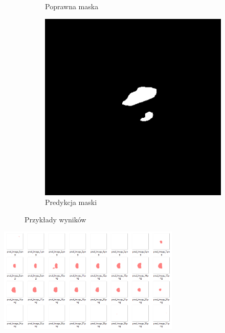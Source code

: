 \documentclass[a4paper,11pt,twoside]{report}
\theoremstyle{definition}
\begin{document}
\begin{figure}[htb]
\begin{subfigure}{0.25\textwidth}
		\caption{Poprawna maska}
		\label{fig:5}
	\end{subfigure}\hfil %
	\begin{subfigure}{0.25\textwidth}
		\includegraphics[width=\linewidth,angle=270,origin=c]{segmentation/segmentation_mask_2.png}
		\caption{Predykcja maski}
		\label{fig:6}
	\end{subfigure}
	\caption{Przykłady wyników}
	\label{fig:images}
\end{figure}

\begin{minipage}[h]{\linewidth}
	\centering
	\includegraphics[width=0.65\textwidth]{segmentation/maski_segmentacji.png}
\end{minipage}
\end{document}
